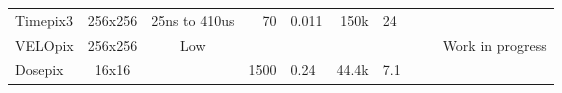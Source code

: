 \documentclass[../main/thesis.tex]{subfiles}
\begin{document}
\begin{sidewaystable}[h!]
\begin{center}
{\begin{tabular}{lccrlrllll}
				Timepix3                          & 256x256  & 25ns to 410us         & 70           & 0.011    & 150k                   & 24       &                & \citep{timepix3}               &                  \\
				VELOpix       & 256x256  & Low                   &              &          &                        &          &                &                                  & Work in progress \\
				Dosepix                           & 16x16    &                       & 1500         & 0.24     & 44.4k                  & 7.1      &                & \citep{dosepix}                &                 
				 \\ \bottomrule%
		\end{tabular}
	}
	\end{center}
\end{sidewaystable}
\end{document}
